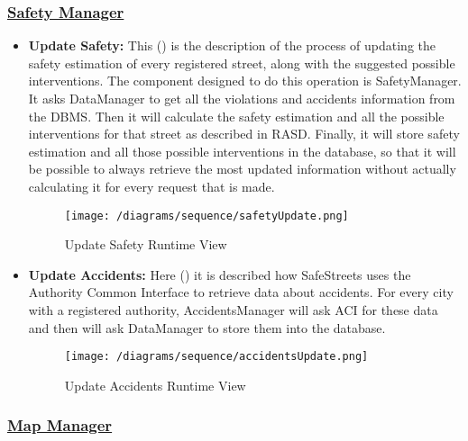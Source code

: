 			\FloatBarrier
		
		\subsubsection[Safety Manager]{\hyperlink{toc}{Safety Manager}}
			\label{sec.safetyManagerRuntime}
			
			\begin{itemize}
				\item \textbf{Update Safety:} This  () is the description of the process of updating the safety estimation of every registered street, along with the suggested possible interventions. The component designed to do this operation is SafetyManager. It asks DataManager to get all the violations and accidents information from the DBMS. Then it will calculate the safety estimation and all the possible interventions for that street as described in RASD. Finally, it will store safety estimation and all those possible interventions in the database, so that it will be possible to always retrieve the most updated information without actually calculating it for every request that is made.
				
				\begin{figure}[h!]
					\centering
					\texttt{[image: /diagrams/sequence/safetyUpdate.png]}
					\caption{\label{fig:safetyUpdateRuntime} Update Safety Runtime View}
				\end{figure}
			
				\item \textbf{Update Accidents:} Here () it is described how SafeStreets uses the Authority Common Interface to retrieve data about accidents. For every city with a registered authority, AccidentsManager will ask ACI for these data and then will ask DataManager to store them into the database.
				
				\begin{figure}[h!]
					\centering
					\texttt{[image: /diagrams/sequence/accidentsUpdate.png]}
					\caption{\label{fig:accidentsUpdateRuntime} Update Accidents Runtime View}
				\end{figure}
			\end{itemize}
		
			\FloatBarrier
		
		\subsubsection[Map Manager]{\hyperlink{toc}{Map Manager}}
		\label{sec:mapManagerRuntime}
		
